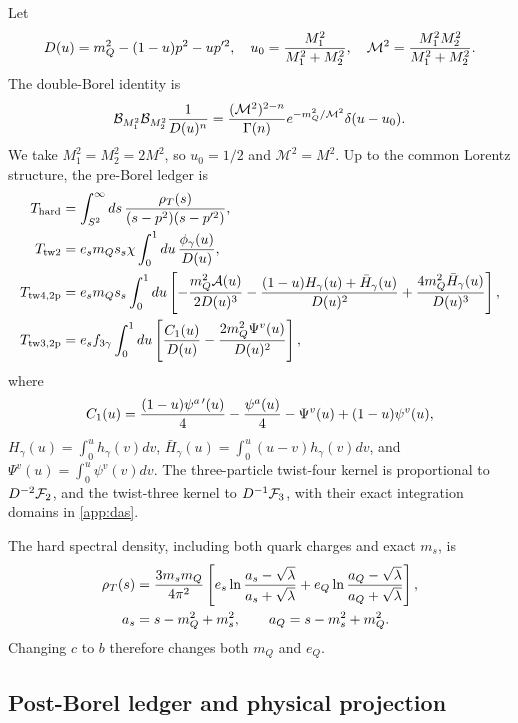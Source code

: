\documentclass[11pt,a4paper]{article}
\newcommand{\Mcal}{\mathcal M}
\begin{document}
Let
\begin{equation}
D(u)=m_Q^2-(1-u)p^2-u p'^2,\quad
u_0={M_1^2\over M_1^2+M_2^2},\quad
\Mcal^2={M_1^2M_2^2\over M_1^2+M_2^2}.
\end{equation}
The double-Borel identity is
\begin{equation}
\mathcal B_{M_1^2}\mathcal B_{M_2^2}{1\over D(u)^n}
={(\Mcal^2)^{2-n}\over\Gamma(n)}
e^{-m_Q^2/\Mcal^2}\delta(u-u_0).
\label{eq:doubleborel}
\end{equation}
We take $M_1^2=M_2^2=2M^2$, so $u_0=1/2$ and $\Mcal^2=M^2$.
Up to the common Lorentz structure, the pre-Borel ledger is
\begin{align}
T_{\rm hard}&=\int_{S^2}^{\infty}ds\,
{\rho_T(s)\over(s-p^2)(s-p'^2)},\label{eq:prehard}\\
T_{\rm tw2}&=e_s m_Qs_s\chi\int_0^1du\,{\phi_\gamma(u)\over D(u)},\\
T_{\rm tw4,2p}&=e_s m_Qs_s\int_0^1du\left[
-{m_Q^2{\cal A}(u)\over2D(u)^3}
-{(1-u)H_\gamma(u)+\bar H_\gamma(u)\over D(u)^2}
+{4m_Q^2\bar H_\gamma(u)\over D(u)^3}\right],\\
T_{\rm tw3,2p}&=e_s f_{3\gamma}\int_0^1du\left[
{C_1(u)\over D(u)}-{2m_Q^2\Psi^v(u)\over D(u)^2}\right],
\end{align}
where
\begin{equation}
C_1(u)={(1-u)\psi^{a\,\prime}(u)\over4}
-{\psi^a(u)\over4}-\Psi^v(u)+(1-u)\psi^v(u),
\end{equation}
$H_\gamma(u)=\int_0^u h_\gamma(v)dv$,
$\bar H_\gamma(u)=\int_0^u(u-v)h_\gamma(v)dv$, and
$\Psi^v(u)=\int_0^u\psi^v(v)dv$.  The three-particle twist-four kernel is
proportional to $D^{-2}{\cal F}_2$, and the twist-three kernel to
$D^{-1}{\cal F}_3$, with their exact integration domains in
\cref{app:das}.

The hard spectral density, including both quark charges and exact $m_s$, is
\begin{align}
\rho_T(s)&={3m_sm_Q\over4\pi^2}
\left[e_s\ln{a_s-\sqrt\lambda\over a_s+\sqrt\lambda}
+e_Q\ln{a_Q-\sqrt\lambda\over a_Q+\sqrt\lambda}\right],\\
a_s&=s-m_Q^2+m_s^2,\qquad a_Q=s-m_s^2+m_Q^2 .
\end{align}
Changing $c$ to $b$ therefore changes both $m_Q$ and $e_Q$.

\subsection{Post-Borel ledger and physical projection}
\end{document}
